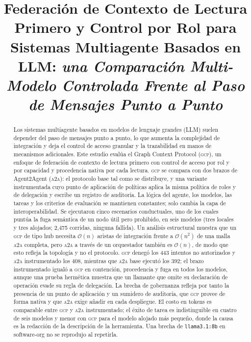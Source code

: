 \documentclass[conference,letterpaper]{IEEEtran}
\newcommand{\gcp}{\textsc{gcp}}
\newcommand{\ata}{\textsc{a2a}}
\newcommand{\bigoh}{\mathcal{O}}
\begin{document}
\title{Federaci\'on de Contexto de Lectura Primero y Control por Rol para Sistemas
Multiagente Basados en LLM: \textit{una Comparaci\'on Multi-Modelo Controlada Frente al Paso de
Mensajes Punto a Punto}}

\author{
}

\maketitle

\begin{abstract}
Los sistemas multiagente basados en modelos de lenguaje grandes (LLM) suelen depender del paso de
mensajes punto a punto, lo que aumenta la complejidad de integración y deja el control de acceso
granular y la trazabilidad en manos de mecanismos adicionales. Este estudio evalúa el Graph Context
Protocol (\gcp{}), un enfoque de federación de contexto de lectura primero con control de acceso por
rol y por capacidad y procedencia nativa por cada lectura. \gcp{} se compara con dos brazos de
Agent2Agent (\ata{}): el protocolo base tal como se distribuye, y una variante instrumentada cuyo punto
de aplicación de políticas aplica la misma política de roles y de delegación y escribe un registro de
auditoría. La lógica del agente, los modelos, las tareas y los criterios de evaluación se mantienen
constantes; solo cambia la capa de interoperabilidad. Se ejecutaron cinco escenarios conductuales, uno
de los cuales puntúa la fuga semántica de un nodo útil pero prohibido, en seis modelos (tres locales y
tres alojados; 2{,}475 corridas, ninguna fallida). Un análisis estructural muestra que un \gcp{} de tipo
hub necesita $\bigoh(n)$ aristas de integración frente a $\bigoh(n^2)$ de una malla \ata{} completa,
pero \ata{} a través de un orquestador también es $\bigoh(n)$, de modo que esto refleja la topología y
no el protocolo. \gcp{} denegó los 443 intentos no autorizados y \ata{} instrumentado los 408, mientras
que \ata{} base ejecutó los 392; el brazo instrumentado igualó a \gcp{} en contención, procedencia y
fuga en todos los modelos, aunque una prueba hermética muestra que un llamante que omite su declaración
de operación evade su regla de delegación. La brecha de gobernanza refleja por tanto la presencia de un punto de
aplicación y un sumidero de auditoría, que \gcp{} provee de forma nativa y que \ata{} exige añadir en
cada despliegue. El costo en tokens es comparable entre \gcp{} y \ata{} instrumentado; el éxito de
tarea es indistinguible en cuatro de seis modelos y menor con \gcp{} para el modelo alojado más pequeño, donde la causa es la redacción de la descripción
de la herramienta. Una brecha de \texttt{llama3.1:8b} en software-org no se reprodujo al repetirla.
\end{abstract}
\end{document}
